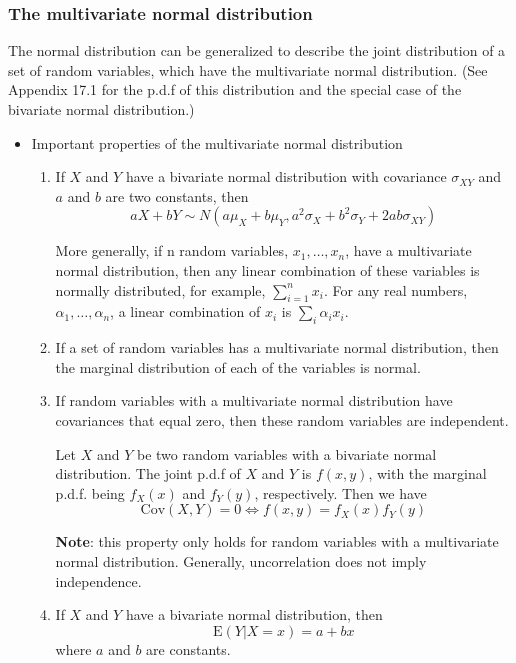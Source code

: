 \documentclass[a4paper,11pt]{article}
\begin{document}
\subsubsection*{The multivariate normal distribution}
\label{sec:orgdb4942f}

The normal distribution can be generalized to describe the joint
distribution of a set of random variables, which have the multivariate
normal distribution. (See Appendix 17.1 for the p.d.f of this
distribution and the special case of the bivariate normal
distribution.)

\begin{itemize}
\item Important properties of the multivariate normal distribution
\label{sec:orgb1e4828}

\begin{enumerate}
\item If \(X\) and \(Y\) have a bivariate normal distribution with covariance
\(\sigma_{XY}\) and \(a\) and \(b\) are two constants, then
\[
   aX + bY \sim N(a\mu_X + b\mu_Y, a^2\sigma_X + b^2\sigma_Y +
   2ab\sigma_{XY})
   \]

More generally, if n random variables, \(x_1, \ldots, x_n\), have a
multivariate normal distribution, then any linear combination of
these variables is normally distributed, for example, \(\sum_{i=1}^n
   x_i\). For any real numbers, \(\alpha_1, \ldots, \alpha_n\), a linear
combination of \({x_i}\) is \(\sum_i \alpha_i x_i\).

\item If a set of random variables has a multivariate normal
distribution, then the marginal distribution of each of the
variables is normal.

\item If random variables with a multivariate normal distribution have
covariances that equal zero, then these random variables are
independent.

Let \(X\) and \(Y\) be two random variables with a bivariate normal
distribution. The joint p.d.f of \(X\) and \(Y\) is \(f(x, y)\), with the
marginal p.d.f. being \(f_X(x)\) and \(f_Y(y)\), respectively. Then we have
\[ \mathrm{Cov}(X, Y) = 0 \Leftrightarrow f(x, y) = f_X(x)f_Y(y) \]

\textbf{Note}: this property only holds for random variables with a
multivariate normal distribution. Generally, uncorrelation does not
imply independence.

\item If \(X\) and \(Y\) have a bivariate normal distribution, then
\[\mathrm{E}(Y|X = x) = a + bx \]
where \(a\) and \(b\) are constants.
\end{enumerate}
\end{itemize}
\end{document}
